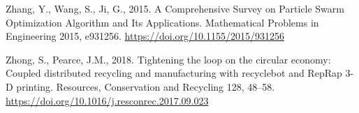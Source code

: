 \documentclass[
  12pt,
  number,
  review]{elsarticle}
\newlength{\cslhangindent}
\newlength{\cslentryspacingunit} %
\newenvironment{CSLReferences}[2] %
 {%
  \setlength{\parindent}{0pt}
  \ifodd #1
  \let\oldpar\par
  \def\par{\hangindent=\cslhangindent\oldpar}
  \fi
  \setlength{\parskip}{#2\cslentryspacingunit}
 }%
 {}
\begin{document}
\begin{CSLReferences}{1}{0}
\leavevmode{}%
Zhang, Y., Wang, S., Ji, G., 2015. A {Comprehensive Survey} on {Particle
Swarm Optimization Algorithm} and {Its Applications}. Mathematical
Problems in Engineering 2015, e931256.
\url{https://doi.org/10.1155/2015/931256}

\leavevmode{}%
Zhong, S., Pearce, J.M., 2018. Tightening the loop on the circular
economy: {Coupled} distributed recycling and manufacturing with
recyclebot and {RepRap} 3-{D} printing. Resources, Conservation and
Recycling 128, 48--58.
\url{https://doi.org/10.1016/j.resconrec.2017.09.023}

\end{CSLReferences}
\end{document}
